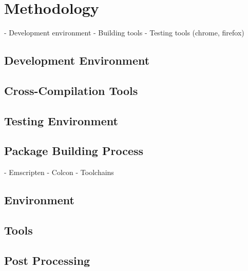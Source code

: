 \chapter{Methodology}\label{cha:methodology}

- Development environment
- Building tools
- Testing tools (chrome, firefox)


\section{Development Environment}\label{sec:devenv}


\section{Cross-Compilation Tools}\label{sec:cross}


\section{Testing Environment}\label{sec:testing}



\section{Package Building Process}\label{cha:build}

- Emscripten
- Colcon
- Toolchains

\section{Environment}


\section{Tools}


\section{Post Processing}
